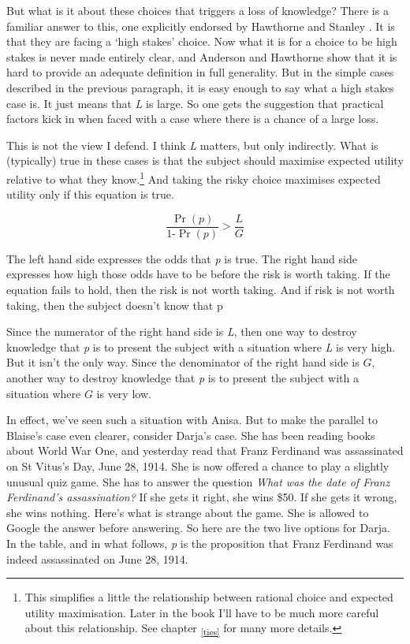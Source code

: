 \documentclass[
  11pt,
]{book}
\begin{document}
But what is it about these choices that triggers a loss of knowledge? There is a familiar answer to this, one explicitly endorsed by Hawthorne \citeyearpar{Hawthorne2004} and Stanley \citeyearpar{Stanley2005}. It is that they are facing a `high stakes' choice. Now what it is for a choice to be high stakes is never made entirely clear, and Anderson and Hawthorne \citeyearpar{AndersonHawthorne2019a} show that it is hard to provide an adequate definition in full generality. But in the simple cases described in the previous paragraph, it is easy enough to say what a high stakes case is. It just means that \emph{L} is large. So one gets the suggestion that practical factors kick in when faced with a case where there is a chance of a large loss.

This is not the view I defend. I think \emph{L} matters, but only indirectly. What is (typically) true in these cases is that the subject should maximise expected utility relative to what they know.\footnote{This simplifies a little the relationship between rational choice and expected utility maximisation. Later in the book I'll have to be much more careful about this relationship. See chapter \textsubscript{\ref{ties}} for many more details.} And taking the risky choice maximises expected utility only if this equation is true.

\[
\frac{\Pr(p)}{1 ‑ \Pr(p)} > \frac{L}{G}
\]

The left hand side expresses the odds that \emph{p} is true. The right hand side expresses how high those odds have to be before the risk is worth taking. If the equation fails to hold, then the risk is not worth taking. And if risk is not worth taking, then the subject doesn't know that p

Since the numerator of the right hand side is \emph{L}, then one way to destroy knowledge that \emph{p} is to present the subject with a situation where \emph{L} is very high. But it isn't the only way. Since the denominator of the right hand side is \(G\), another way to destroy knowledge that \emph{p} is to present the subject with a situation where \(G\) is very low.

In effect, we've seen such a situation with Anisa. But to make the parallel to Blaise's case even clearer, consider Darja's case. She has been reading books about World War One, and yesterday read that Franz Ferdinand was assassinated on St Vitus's Day, June 28, 1914. She is now offered a chance to play a slightly unusual quiz game. She has to answer the question \emph{What was the date of Franz Ferdinand's assassination?} If she gets it right, she wins \$50. If she gets it wrong, she wins nothing. Here's what is strange about the game. She is allowed to Google the answer before answering. So here are the two live options for Darja. In the table, and in what follows, \emph{p} is the proposition that Franz Ferdinand was indeed assassinated on June 28, 1914.
\end{document}
